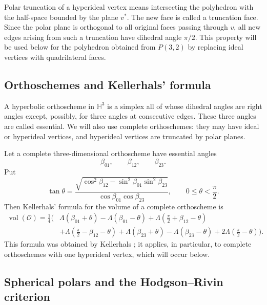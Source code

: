 \documentclass[12pt,a4paper]{article}
\theoremstyle{definition}
\DeclareMathOperator{\Vol}{vol}
\newcommand{\HH}{\mathbb H}
\begin{document}
Polar truncation of a hyperideal vertex means intersecting the polyhedron with the half-space bounded by the plane \(v^*\). The new face is called a truncation face. Since the polar plane is orthogonal to all original faces passing through \(v\), all new edges arising from such a truncation have dihedral angle \(\pi/2\). This property will be used below for the polyhedron obtained from \(P(3,2)\) by replacing ideal vertices with quadrilateral faces.

\subsection{Orthoschemes and Kellerhals' formula}

A hyperbolic orthoscheme in \(\HH^3\) is a simplex all of whose dihedral angles are right angles except, possibly, for three angles at consecutive edges. These three angles are called essential. We will also use complete orthoschemes: they may have ideal or hyperideal vertices, and hyperideal vertices are truncated by polar planes.

Let a complete three-dimensional orthoscheme have essential angles
\[
        \beta_{01},\qquad \beta_{12},\qquad \beta_{23}.
\]
Put
\[
        \tan\theta=
        \frac{
        \sqrt{\cos^2\beta_{12}-\sin^2\beta_{01}\sin^2\beta_{23}}
        }{
        \cos\beta_{01}\cos\beta_{23}
        },
        \qquad
        0\le \theta<\frac{\pi}{2}.
\]
Then Kellerhals' formula for the volume of a complete orthoscheme is
\begin{align}\label{eq:kellerhals}
        \Vol(\mathcal O)=\frac14\bigg(&
        \Lambda(\beta_{01}+\theta)-\Lambda(\beta_{01}-\theta)
        +\Lambda\left(\frac{\pi}{2}+\beta_{12}-\theta\right)  \\
        &+\Lambda\left(\frac{\pi}{2}-\beta_{12}-\theta\right)
        +\Lambda(\beta_{23}+\theta)-\Lambda(\beta_{23}-\theta)
        +2\Lambda\left(\frac{\pi}{2}-\theta\right)
        \bigg).
\end{align}
This formula was obtained by Kellerhals
\cite[Equations~(4)--(5) and Theorem~2]{Kellerhals1989}; it applies, in
particular, to complete orthoschemes with one hyperideal vertex, which will
occur below.





\subsection{Spherical polars and the Hodgson--Rivin criterion}\label{subsec:rhs-prelim}
\end{document}
